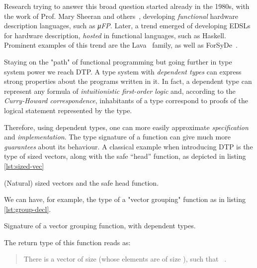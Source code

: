     Research trying to answer this broad question started already in the 1980s,
    with the work of Prof. Mary Sheeran and others~\cite{sheeran-survey},
    developing \emph{functional} hardware description languages, such as \emph{μFP}.
    Later, a trend emerged of developing \acp{EDSL} for hardware description,
    \emph{hosted} in functional languages, such as Haskell.
    Prominent examples of this trend are the Lava~\cite{lava-1999} family,
    as well as ForSyDe~\cite{forsyde1999}.

    Staying on the "path" of functional programming but going further in type system power we reach \ac{DTP}.
    A type system with \emph{dependent types} can express strong properties about the programs written in it.
    In fact, a dependent type can represent any formula of \emph{intuitionistic first-order logic} and,
    according to the \emph{Curry-Howard correspondence},
    inhabitants of a type correspond to proofs of the logical statement represented by the type.

    Therefore, using dependent types,
    one can more easily approximate \emph{specification} and \emph{implementation}.
    The type signature of a function can give much more \emph{guarantees} about its behaviour.
    A classical example when introducing \ac{DTP} is the type of sized vectors,
    along with the safe ``head'' function, as depicted in listing \ref{lst:sized-vec}
    \begin{listing}[h]
        \caption{(Natural) sized vectors and the safe head function. \label{lst:sized-vec}}
    \end{listing}

    We can have, for example, the type of a "vector grouping" function as in listing \ref{lst:group-decl}.
    \begin{listing}[h]
        \caption{Signature of a vector grouping function, with dependent types. \label{lst:group-decl}}
    \end{listing}

    The return type of this function reads as:
    \begin{quote}
        There is a vector  of size 
        (whose elements are of size ), such that \texttt{   }.
    \end{quote}

